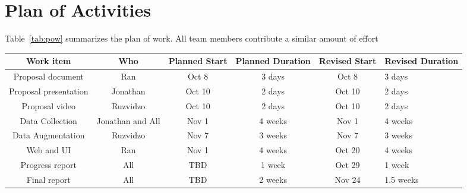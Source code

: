 \documentclass[sigconf,11pt]{acmart}
\begin{document}
\section*{Plan of Activities}

Table~\ref{tab:pow} summarizes the plan of work.
All team members contribute a similar amount of effort
\begin{table*}
  \caption{Plan of Work in high level}
  \label{tab:pow}
  \begin{tabular}{cccccl}
    \toprule
    Work item               & Who               & Planned Start & Planned Duration & Revised Start & Revised Duration \\
    \midrule
    Proposal document       & Ran               & Oct 8         & 3 days           & Oct 8                        & 3 days           \\
    Proposal presentation   & Jonathan          & Oct 10        & 2 days           & Oct 10                       & 2 days           \\
    Proposal video          & Ruzvidzo          & Oct 10        & 2 days           & Oct 10                       & 2 days           \\
    Data Collection         & Jonathan and All  & Nov 1         & 4 weeks          & Nov 1                        & 4 weeks          \\
    Data Augmentation       & Ruzvidzo          & Nov 7         & 3 weeks          & Nov 7                        & 3 weeks          \\
    Web and UI              & Ran               & Nov 1         & 4 weeks          & \colorbox{yellow!30}{Oct 20} & 4 weeks          \\
    Progress report         & All               & TBD           & 1 week           & \colorbox{yellow!30}{Oct 29} & 1 week           \\
    Final report            & All               & TBD           & 2 weeks          & \colorbox{yellow!30}{Nov 24} & \colorbox{yellow!30}{1.5 weeks}        \\
  \bottomrule
\end{tabular}
\end{table*}
\end{document}

